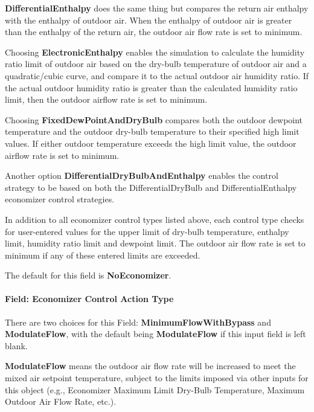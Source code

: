 \textbf{DifferentialEnthalpy} does the same thing but compares the return air enthalpy with the enthalpy of outdoor air. When the enthalpy of outdoor air is greater than the enthalpy of the return air, the outdoor air flow rate is set to minimum.

Choosing \textbf{ElectronicEnthalpy} enables the simulation to calculate the humidity ratio limit of outdoor air based on the dry-bulb temperature of outdoor air and a quadratic/cubic curve, and compare it to the actual outdoor air humidity ratio. If the actual outdoor humidity ratio is greater than the calculated humidity ratio limit, then the outdoor airflow rate is set to minimum.

Choosing \textbf{FixedDewPointAndDryBulb} compares both the outdoor dewpoint temperature and the outdoor dry-bulb temperature to their specified high limit values. If either outdoor temperature exceeds the high limit value, the outdoor airflow rate is set to minimum.

Another option \textbf{DifferentialDryBulbAndEnthalpy} enables the control strategy to be based on both the DifferentialDryBulb and DifferentialEnthalpy economizer control strategies.

In addition to all economizer control types listed above, each control type checks for user-entered values for the upper limit of dry-bulb temperature, enthalpy limit, humidity ratio limit and dewpoint limit. The outdoor air flow rate is set to minimum if any of these entered limits are exceeded.

The default for this field is \textbf{NoEconomizer}.

\paragraph{Field: Economizer Control Action Type}\label{field-economizer-control-action-type}

There are two choices for this Field: \textbf{MinimumFlowWithBypass} and \textbf{ModulateFlow}, with the default being \textbf{ModulateFlow} if this input field is left blank.

\textbf{ModulateFlow} means the outdoor air flow rate will be increased to meet the mixed air setpoint temperature, subject to the limits imposed via other inputs for this object (e.g., Economizer Maximum Limit Dry-Bulb Temperature, Maximum Outdoor Air Flow Rate, etc.).

